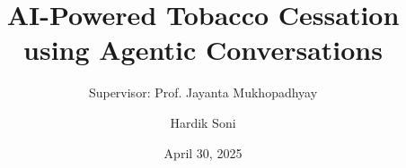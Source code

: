 \documentclass[aspectratio=169,xcolor=dvipsnames]{beamer}
\title{AI-Powered Tobacco Cessation using Agentic Conversations}
\subtitle{Supervisor: Prof. Jayanta Mukhopadhyay}
\author{Hardik Soni}
\institute
{
    Department of Computer Science and Engineering \\
    Indian Institute of Technology Kharagpur %
}
\date{April 30, 2025} %
\begin{document}
\begin{frame}[plain]
    \titlepage
\end{frame}















\end{document}
